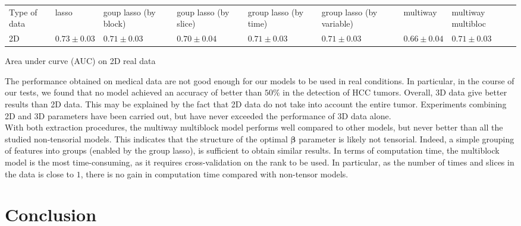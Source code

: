 \documentclass[preprint,12pt]{elsarticle}
\begin{document}
\begin{table}[tbp]
\begin{adjustbox}{center}
\begin{tabular}{|>{\centering\arraybackslash}m{2cm}|>{\centering\arraybackslash}m{2cm}|>{\centering\arraybackslash}m{2cm}|>{\centering\arraybackslash}m{2cm}|>{\centering\arraybackslash}m{2.5cm}|>{\centering\arraybackslash}m{2.5cm}|>{\centering\arraybackslash}m{2cm}|>{\centering\arraybackslash}m{2cm}|}
    \cline{1-8}
    Type of data & lasso & goup lasso (by block) & goup lasso (by slice)& group lasso (by time)& group lasso (by variable) & multiway & multiway multibloc\\
    \cline{1-8} 
    2D & $0.73 \pm 0.03$ & $0.71 \pm 0.03$ & $0.70 \pm 0.04$ & $0.71 \pm 0.03 $  & $0.71 \pm 0.03$ & $0.66 \pm 0.04$ & $0.71 \pm 0.03$ \\
    \cline{1-8}
\end{tabular}
\end{adjustbox}
\parbox{0.9\textwidth}{
\vspace{0.2 cm}    
\centering \small Area under curve (AUC) on 2D real data}
\end{table}
The performance obtained on medical data are not good enough for our models to be used in real conditions. In particular, in the course of our tests, we found that no model achieved an accuracy of better than $50\%$ in the detection of HCC tumors. Overall, 3D data give better results than 2D data. This may be explained by the fact that 2D data do not take into account the entire tumor. Experiments combining 2D and 3D parameters have been carried out, but have never exceeded the performance of 3D data alone.\\
\indent With both extraction procedures, the multiway multiblock model performs well compared to other models, but never better than all the studied non-tensorial models. This indicates that the structure of the optimal $\bm{\beta}$ parameter is likely not tensorial. Indeed, a simple grouping of features into groups (enabled by the group lasso), is sufficient to obtain similar results. In terms of computation time, the multiblock model is the most time-consuming, as it requires cross-validation on the rank to be used. In particular, as the number of times and slices in the data is close to $1$, there is no gain in computation time compared with non-tensor models.\\


\section{Conclusion}
\end{document}
